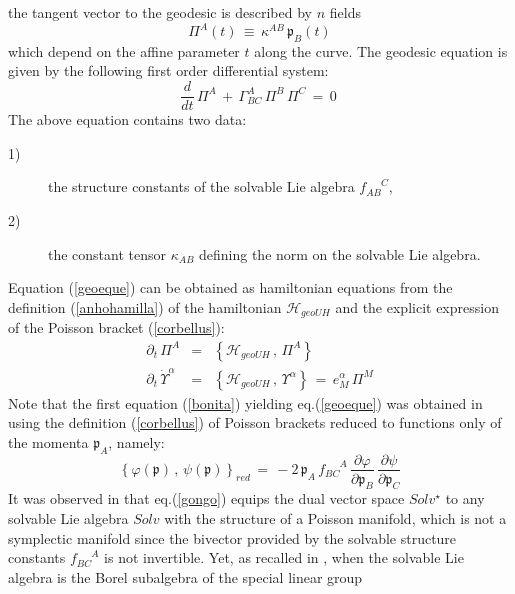 \documentclass[10pt,a4paper]{article}
\begin{document}
the tangent vector to the geodesic is described by $n$ fields
\begin{equation}\label{certosio}
  \Pi^A(t)\, \equiv \, \kappa^{AB}\, \mathfrak{p}_B(t)
\end{equation}
which depend on the affine parameter $t$ along
the curve. The geodesic equation is given by the following first order differential system:
\begin{equation}\label{geoeque}
    \frac{d}{dt} \,\Pi^{A} \, + \, \Gamma^{A}_{BC} \, \Pi^B \, \Pi^C \, = \,0~
\end{equation}
The above equation contains two data:
\begin{description}
  \item[1)] the structure constants of the solvable Lie algebra
  $f_{AB}^{\phantom{AB}C}$,
  \item[2)] the constant tensor $\kappa_{AB}$ defining the norm on the solvable Lie algebra.
\end{description}
Equation (\ref{geoeque}) can be obtained as hamiltonian equations from the definition (\ref{anhohamilla}) of the hamiltonian
$\mathcal{H}_{geoUH}$ and the explicit expression of the Poisson bracket (\ref{corbellus}):
\begin{eqnarray}
  \partial_t \, \Pi^A &=& \left\{\mathcal{H}_{geoUH}\, , \, \Pi^A\right\} \label{bonita}\\
  \partial_t \, \dot{\Upsilon}^\alpha &=& \left\{\mathcal{H}_{geoUH}\, , \,\Upsilon^\alpha \right\} \, =\, e^\alpha_M \, \Pi^M
  \label{dimenticata}
\end{eqnarray}
Note that the first equation (\ref{bonita}) yielding eq.(\ref{geoeque}) was obtained in \cite{sashaebog} using the definition (\ref{corbellus}) of Poisson brackets reduced to functions only of the momenta $\mathfrak{p}_A$, namely:
\begin{equation}\label{gongo}
  \left\{\varphi(\mathfrak{p})\, , \, \psi(\mathfrak{p}) \right\}_{red} \, = \, -2 \, \mathfrak{p}_A \, f^{\phantom{BC}A}_{BC} \, \frac{\partial \varphi}{\partial \mathfrak{p}_B} \, \frac{\partial \psi }{\partial \mathfrak{p}_C}
\end{equation}
It was observed in \cite{sashaebog} that eq.(\ref{gongo}) equips the dual vector space $Solv^\star$ to any solvable Lie algebra $Solv$ with the structure of a Poisson manifold, which is not a symplectic manifold since the bivector provided by the solvable structure constants $f^{\phantom{BC}A}_{BC}$ is not invertible. Yet, as recalled in \cite{sashaebog}, when the solvable Lie algebra is the Borel subalgebra of the special linear group
\end{document}
